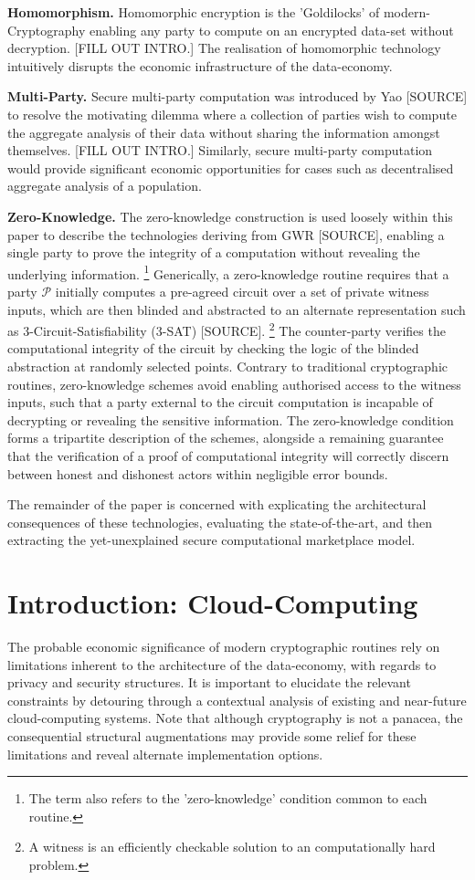 \documentclass[twocolumn]{scrartcl}
\begin{document}

\textbf{Homomorphism.} Homomorphic encryption is the 'Goldilocks' of modern-Cryptography enabling any party to compute on an encrypted data-set without decryption. [FILL OUT INTRO.] The realisation of homomorphic technology intuitively disrupts the economic infrastructure of the data-economy.

\textbf{Multi-Party.} Secure multi-party computation was introduced by Yao [SOURCE] to resolve the motivating dilemma where a collection of parties wish to compute the aggregate analysis of their data without sharing the information amongst themselves. [FILL OUT INTRO.] Similarly, secure multi-party computation would provide significant economic opportunities for cases such as decentralised aggregate analysis of a population.

\textbf{Zero-Knowledge.} The zero-knowledge construction is used loosely within this paper to describe the technologies deriving from GWR [SOURCE], enabling a single party to prove the integrity of a computation without revealing the underlying information. \footnote{The term also refers to the 'zero-knowledge' condition common to each routine.} Generically, a zero-knowledge routine requires that a party $\mathcal{P}$ initially computes a pre-agreed circuit over a set of private witness inputs, which are then blinded and abstracted to an alternate representation such as 3-Circuit-Satisfiability (3-SAT) [SOURCE]. \footnote{A witness is an efficiently checkable solution to an computationally hard problem.} The counter-party verifies the computational integrity of the circuit by checking the logic of the blinded abstraction at randomly selected points. Contrary to traditional cryptographic routines, zero-knowledge schemes avoid enabling authorised access to the witness inputs, such that a party external to the circuit computation is incapable of decrypting or revealing the sensitive information. The zero-knowledge condition forms a tripartite description of the schemes, alongside a remaining guarantee that the verification of a proof of computational integrity will correctly discern between honest and dishonest actors within negligible error bounds.

The remainder of the paper is concerned with explicating the architectural consequences of these technologies, evaluating the state-of-the-art, and then extracting the yet-unexplained secure computational marketplace model.

\section{Introduction: Cloud-Computing}
The probable economic significance of modern cryptographic routines rely on limitations inherent to the architecture of the data-economy, with regards to privacy and security structures. It is important to elucidate the relevant constraints by detouring through a contextual analysis of existing and near-future cloud-computing systems. Note that although cryptography is not a panacea, the consequential structural augmentations may provide some relief for these limitations and reveal alternate implementation options.
\end{document}
